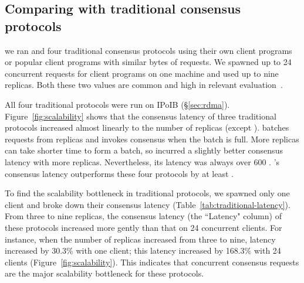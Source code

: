 \subsection{Comparing with traditional consensus protocols}
\label{sec:eval-traditional}

we ran \xxx and four traditional consensus protocols using their own 
client programs or popular client programs with similar bytes of requests.
We spawned up to 24 concurrent requests for client programs on one machine and 
used up to nine replicas. Both these two values are common and 
high in 
relevant evaluation~\cite{zookeeper,crane:sosp15,rex:eurosys14,dare:hpdc15}.


All four traditional protocols were run on IPoIB (\S\ref{sec:rdma}). 
Figure~\ref{fig:scalability} shows that the consensus latency of three 
traditional protocols increased almost linearly to the number of replicas 
(except \spaxos). \spaxos batches requests from replicas and invokes consensus 
when the batch is full. More replicas can take shorter time to form a batch, so 
\spaxos incurred a slightly better consensus latency with more replicas. 
Nevertheless, its latency was always over 600 \us. \xxx's consensus latency 
outperforms these four protocols by at least \comptradlow.



To find the scalability bottleneck in traditional protocols, we spawned 
only one client and broke down their consensus 
latency (Table~\ref{tab:traditional-latency}). From three to nine replicas, the 
consensus latency (the ``Latency" column) of these protocols increased more 
gently than that on 24 concurrent clients. For instance, when the number of 
replicas increased from three to nine, \zookeeper latency increased by 30.3\% 
with one client; this latency increased by 168.3\% with 24 clients 
(Figure~\ref{fig:scalability}). This indicates that concurrent consensus 
requests are the major scalability bottleneck for these protocols.

